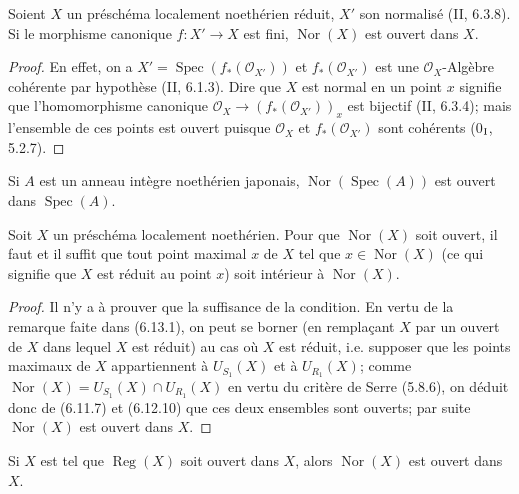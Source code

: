 \begin{proposition}[6.13.2]
\label{IV.2.s6.13.2-fr}
Soient $X$ un préschéma localement noethérien réduit, $X'$ son normalisé
(II, 6.3.8). Si le morphisme canonique $f:X'\to X$ est fini,
$\operatorname{Nor}(X)$ est ouvert dans $X$.
\end{proposition}

\begin{proof}
En effet, on a $X'=\operatorname{Spec}(f_*(\mathcal O_{X'}))$ et
$f_*(\mathcal O_{X'})$ est une $\mathcal O_X$-Algèbre cohérente par
hypothèse (II, 6.1.3). Dire que $X$ est normal en un point $x$ signifie que
l'homomorphisme canonique
$\mathcal O_X\to(f_*(\mathcal O_{X'}))_x$ est bijectif (II, 6.3.4); mais
l'ensemble de ces points est ouvert puisque $\mathcal O_X$ et
$f_*(\mathcal O_{X'})$ sont cohérents (0$_{\rm I}$, 5.2.7).
\end{proof}

\begin{corollary}[6.13.3]
\label{IV.2.s6.13.3-fr}
Si $A$ est un anneau intègre noethérien japonais,
$\operatorname{Nor}(\operatorname{Spec}(A))$ est ouvert dans
$\operatorname{Spec}(A)$.
\end{corollary}

\begin{proposition}[6.13.4]
\label{IV.2.s6.13.4-fr}
Soit $X$ un préschéma localement noethérien. Pour que
$\operatorname{Nor}(X)$ soit ouvert, il faut et il suffit que tout point
maximal $x$ de $X$ tel que $x\in\operatorname{Nor}(X)$ (ce qui signifie que
$X$ est réduit au point $x$) soit intérieur à $\operatorname{Nor}(X)$.
\end{proposition}

\begin{proof}
Il n'y a à prouver que la suffisance de la condition. En vertu de la
remarque faite dans (6.13.1), on peut se borner (en remplaçant $X$ par un
ouvert de $X$ dans lequel $X$ est réduit) au cas où $X$ est réduit, i.e.
supposer que les points maximaux de $X$ appartiennent à $U_{S_1}(X)$ et à
$U_{R_1}(X)$; comme
$\operatorname{Nor}(X)=U_{S_1}(X)\cap U_{R_1}(X)$ en vertu du critère de
Serre (5.8.6), on déduit donc de (6.11.7) et (6.12.10) que ces deux ensembles
sont ouverts; par suite $\operatorname{Nor}(X)$ est ouvert dans $X$.
\end{proof}

\begin{corollary}[6.13.5]
\label{IV.2.s6.13.5-fr}
Si $X$ est tel que $\operatorname{Reg}(X)$ soit ouvert dans $X$, alors
$\operatorname{Nor}(X)$ est ouvert dans $X$.
\end{corollary}

